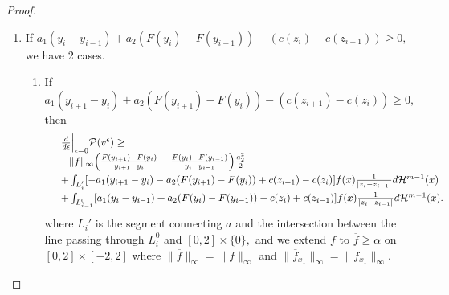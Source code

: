 \documentclass[12pt,reqno]{amsart}
\begin{document}
\begin{proof}
\begin{enumerate}
     we get that 
    \[\vspace{-4pt}\begin{array}{ll}
         &\frac{d}{d\epsilon}\Big|_{\epsilon=0} \mathcal P(v^\epsilon)\ge\vspace{3pt}\\  
         &
         - \|f\|_\infty\frac{(1-a_1)^2}{2}\Big(\frac{y_i-y_{i-1}}{F(y_i)-F(y_{i-1})}-\frac{y_{i+1}-y_i}{F(y_{i+1})-F(y_i)}\Big)\vspace{3pt} \\
      &+\int_{L^0_{i}}[-a_1(y_{i+1}-y_i)-a_2(F(y_{i+1})-F(y_i)) +c(z_{i+1})-c(z_{i}) ]f(x)\frac{1}{|z_i-z_{i+1}|}d\mathcal H^{m-1}(x) \vspace{3pt}\\
&+     \int_{L'_{i-1}}[a_1(y_i-y_{i-1})+a_2(F(y_{i})-F(y_{i-1}))-c(z_i) + c(z_{i-1}) ]f(x)\frac{1}{|z_i-z_{i-1}|}d\mathcal H^{m-1}(x). 
\end{array}\]
     which is similar to equation \eqref{optcond2} after using \eqref{mass bound2} in the proof of Lemma \ref{case2} and can be solved using the same argument to get $\frac{d}{d\epsilon}\Big|_{\epsilon=0} \mathcal P(v^\epsilon)>0.$

\item If $ a_1(y_{i}-y_{i-1})+a_2(F(y_{i})-F(y_{i-1})) -(c(z_{i})-c(z_{i-1}))\ge0,$ we have 2 cases.

\begin{enumerate}
\item If  $a_1(y_{i+1}-y_i)+a_2(F(y_{i+1})-F(y_i)) -(c(z_{i+1})-c(z_i))\ge0,$
 then 
\[\begin{array}{ll}
        & \frac{d}{d\epsilon}\Big|_{\epsilon=0} \mathcal P(v^\epsilon)   \ge\\&
         -\|f\|_\infty\Big(\frac{F(y_{i+1})-F(y_i)}{y_{i+1}-y_i}-\frac{F(y_{i})-F(y_{i-1})}{y_{i}-y_{i-1}}\Big)\frac{a_2^2}{2}\vspace{3pt}\\
      &+\int_{L'_{i}}[-a_1(y_{i+1}-y_i)-a_2(F(y_{i+1})-F(y_i)) +c(z_{i+1})-c(z_{i}) ]f(x)\frac{1}{|z_i-z_{i+1}|}d\mathcal H^{m-1}(x) \vspace{3pt}\\
&+    \int_{L^0_{i-1}}[a_1(y_i-y_{i-1})+a_2(F(y_{i})-F(y_{i-1}))-c(z_i) + c(z_{i-1}) ]f(x)\frac{1}{|z_i-z_{i-1}|}d\mathcal H^{m-1}(x). 
\end{array}\]
          where $L_{i}'$ is the segment connecting $a$ and the intersection between the line passing through $L^0_{i}$ and  $[0,2]\times\{0\},$ and we extend $f$ to $\overline{f}\ge\alpha$ on $[0,2]\times[-2,2]$ where $\|\overline{f}\|_\infty=\|f\|_\infty$ and $\|\overline{f}_{x_1}\|_\infty=\|f_{x_1}\|_\infty.$ 
          

\end{enumerate}
\end{enumerate}
\end{proof}
\end{document}
